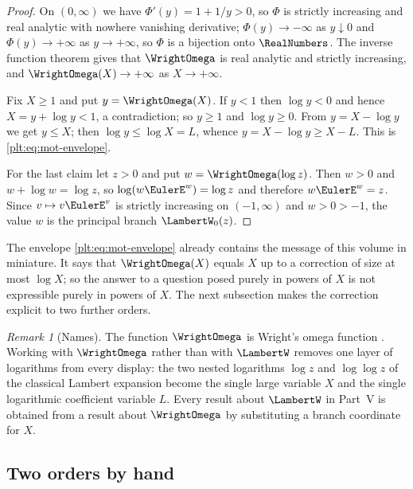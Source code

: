 \documentclass[11pt,oneside]{article}
\theoremstyle{plain}
\theoremstyle{definition}
\theoremstyle{remark}
\newtheorem{remark}[theorem]{Remark}
\begin{document}
\begin{proof}
On \((0,\infty)\) we have \(\Phi'(y)=1+1/y>0\), so \(\Phi\) is strictly
increasing and real analytic with nowhere vanishing derivative;
\(\Phi(y)\to-\infty\) as \(y\downarrow0\) and \(\Phi(y)\to+\infty\) as
\(y\to+\infty\), so \(\Phi\) is a bijection onto \(\RealNumbers\).  The inverse
function theorem gives that \(\WrightOmega\) is real analytic and strictly
increasing, and \(\WrightOmega(X)\to+\infty\) as \(X\to+\infty\).

Fix \(X\ge1\) and put \(y=\WrightOmega(X)\).  If \(y<1\) then \(\log y<0\) and
hence \(X=y+\log y<1\), a contradiction; so \(y\ge1\) and \(\log y\ge0\).  From
\(y=X-\log y\) we get \(y\le X\); then \(\log y\le\log X=L\), whence
\(y=X-\log y\ge X-L\).  This is \eqref{plt:eq:mot-envelope}.

For the last claim let \(z>0\) and put \(w=\WrightOmega(\log z)\).  Then
\(w>0\) and \(w+\log w=\log z\), so \(\log(w\EulerE^{w})=\log z\) and
therefore \(w\EulerE^{w}=z\).  Since \(v\mapsto v\EulerE^{v}\) is strictly
increasing on \((-1,\infty)\) and \(w>0>-1\), the value \(w\) is the principal
branch \(\LambertW_{0}(z)\).
\end{proof}

The envelope \eqref{plt:eq:mot-envelope} already contains the message of this
volume in miniature.  It says that \(\WrightOmega(X)\) equals \(X\) up to a
correction of size at most \(\log X\); so the answer to a question posed purely
in powers of \(X\) is not expressible purely in powers of \(X\).  The next
subsection makes the correction explicit to two further orders.

\begin{remark}[Names]
\label{plt:rmk:mot-names}
The function \(\WrightOmega\) is Wright's omega function
\cite{wright-omega,corless-et-al-1996}.  Working with \(\WrightOmega\) rather
than with \(\LambertW\) removes one layer of logarithms from every display: the
two nested logarithms \(\log z\) and \(\log\log z\) of the classical Lambert
expansion become the single large variable \(X\) and the single logarithmic
coefficient variable \(L\).  Every result about \(\LambertW\) in Part~V is
obtained from a result about \(\WrightOmega\) by substituting a branch
coordinate for \(X\).
\end{remark}

\subsection{Two orders by hand}
\label{plt:sec:mot-two-orders}
\end{document}
